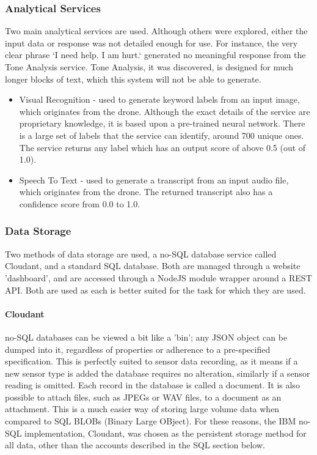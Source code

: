 \documentclass{article}
\begin{document}
\subsubsection{Analytical Services}\label{AnalyticalServices}
Two main analytical services are used. Although others were explored, either the input data or response was not detailed enough for use. For instance, the very clear phrase `I need help. I am hurt.` generated no meaningful response from the Tone Analysis service. Tone Analysis, it was discovered, is designed for much longer blocks of text, which this system will not be able to generate.
\begin{itemize}
	\item Visual Recognition - used to generate keyword labels from an input image, which originates from the drone. Although the exact details of the service are proprietary knowledge, it is based upon a pre-trained neural network. There is a large set of labels that the service can identify, around 700 unique ones. The service returns any label which has an output score of above 0.5 (out of 1.0). 
	\item Speech To Text - used to generate a transcript from an input audio file, which originates from the drone. The returned transcript also has a confidence score from 0.0 to 1.0. 
\end{itemize}

\subsubsection{Data Storage}
Two methods of data storage are used, a no-SQL database service called Cloudant, and a standard SQL database. Both are managed through a website 'dashboard', and are accessed through a NodeJS module wrapper around a REST API. Both are used as each is better suited for the task for which they are used.
\paragraph{Cloudant}
no-SQL databases can be viewed a bit like a 'bin'; any JSON object can be dumped into it, regardless of properties or adherence to a pre-specified specification. This is perfectly suited to sensor data recording, as it means if a new sensor type is added the database requires no alteration, similarly if a sensor reading is omitted. Each record in the database is called a document. It is also possible to attach files, such as JPEGs or WAV files, to a document as an attachment. This is a much easier way of storing large volume data when compared to SQL BLOBs (Binary Large OBject). For these reasons, the IBM no-SQL implementation, Cloudant, was chosen as the persistent storage method for all data, other than the accounts described in the SQL section below. 
\end{document}
